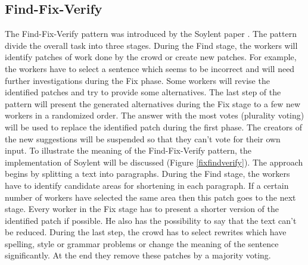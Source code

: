 \subsection{Find-Fix-Verify}
The Find-Fix-Verify pattern was introduced by the Soylent paper \cite{soylent}. The pattern divide the overall task into three stages. During the Find stage, the workers will identify patches of work done by the crowd or create new patches. For example, the workers have to select a sentence which seems to be incorrect and will need further investigations during the Fix phase. Some workers will revise the identified patches and try to provide some alternatives. The last step of the pattern will present the generated alternatives during the Fix stage to a few new workers in a randomized order. The answer with the most votes (plurality voting) will be used to replace the identified patch during the first phase. The creators of the new suggestions will be suspended so that they can't vote for their own input. To illustrate the meaning of the Find-Fix-Verify pattern, the implementation of Soylent will be discussed (Figure \ref{fixfindverify}). The approach begins by splitting a text into paragraphs. During the Find stage, the workers have to identify candidate areas for shortening in each paragraph. If a certain number of workers have selected the same area then this patch goes to the next stage. Every worker in the Fix stage has to present a shorter version of the identified patch if possible. He also has the possibility to say that the text can't be reduced. During the last step, the crowd has to select rewrites which have spelling, style or grammar problems or change the meaning of the sentence significantly. At the end they remove these patches by a majority voting.
